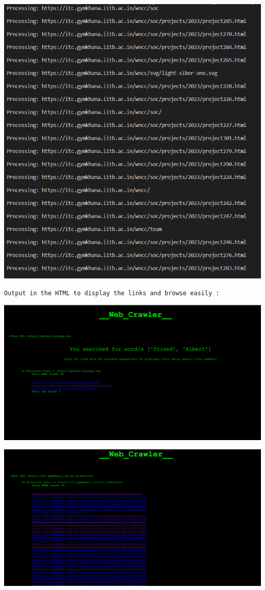 \documentclass{article}
\begin{document}
\vspace{1cm}
\includegraphics[scale=0.7]{qq (1).png}
\vspace{4cm}

\texttt{Output in the HTML to display the links and browse easily :}

\includegraphics[scale=0.4]{qq (2).png}

\includegraphics[scale=0.4]{qq (3).png}
\end{document}
